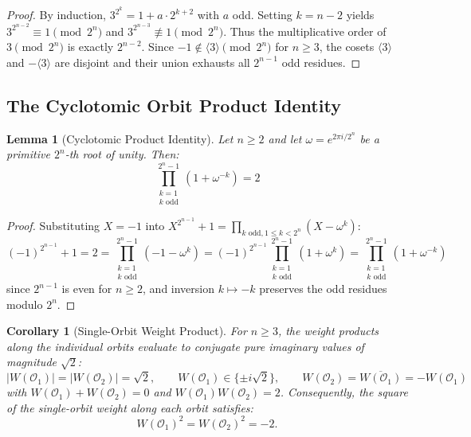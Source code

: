 \documentclass[11pt,reqno]{article}
\theoremstyle{plain}
\newtheorem{lemma}[theorem]{Lemma}
\newtheorem{corollary}[theorem]{Corollary}
\theoremstyle{definition}
\theoremstyle{remark}
\begin{document}
\begin{proof}
By induction, $3^{2^k} = 1 + a \cdot 2^{k+2}$ with $a$ odd. Setting $k = n - 2$ yields $3^{2^{n-2}} \equiv 1 \pmod{2^n}$ and $3^{2^{n-3}} \not\equiv 1 \pmod{2^n}$. Thus the multiplicative order of $3 \pmod{2^n}$ is exactly $2^{n-2}$. Since $-1 \notin \langle 3 \rangle \pmod{2^n}$ for $n \ge 3$, the cosets $\langle 3 \rangle$ and $-\langle 3 \rangle$ are disjoint and their union exhausts all $2^{n-1}$ odd residues.
\end{proof}

\subsection{The Cyclotomic Orbit Product Identity}

\begin{lemma}[Cyclotomic Product Identity]
\label{lem:cyclotomic_product}
Let $n \ge 2$ and let $\omega = e^{2\pi i / 2^n}$ be a primitive $2^n$-th root of unity. Then:
\[
\prod_{\substack{k=1 \\ k \text{ odd}}}^{2^n - 1} (1 + \omega^{-k}) = 2
\]
\end{lemma}

\begin{proof}
Substituting $X = -1$ into $X^{2^{n-1}} + 1 = \prod_{k \text{ odd}, 1 \le k < 2^n} (X - \omega^k)$:
\[
(-1)^{2^{n-1}} + 1 = 2 = \prod_{\substack{k=1 \\ k \text{ odd}}}^{2^n - 1} (-1 - \omega^k) = (-1)^{2^{n-1}} \prod_{\substack{k=1 \\ k \text{ odd}}}^{2^n - 1} (1 + \omega^k) = \prod_{\substack{k=1 \\ k \text{ odd}}}^{2^n - 1} (1 + \omega^{-k})
\]
since $2^{n-1}$ is even for $n \ge 2$, and inversion $k \mapsto -k$ preserves the odd residues modulo $2^n$.
\end{proof}

\begin{corollary}[Single-Orbit Weight Product]
\label{cor:orbit_weight}
For $n \ge 3$, the weight products along the individual orbits evaluate to conjugate pure imaginary values of magnitude $\sqrt{2}$:
\[
|W(\mathcal{O}_1)| = |W(\mathcal{O}_2)| = \sqrt{2}, \qquad W(\mathcal{O}_1) \in \{\pm i \sqrt{2}\}, \qquad W(\mathcal{O}_2) = \overline{W(\mathcal{O}_1)} = -W(\mathcal{O}_1)
\]
with $W(\mathcal{O}_1) + W(\mathcal{O}_2) = 0$ and $W(\mathcal{O}_1) W(\mathcal{O}_2) = 2$. Consequently, the square of the single-orbit weight along each orbit satisfies:
\[
W(\mathcal{O}_1)^2 = W(\mathcal{O}_2)^2 = -2.
\]
\end{corollary}
\end{document}
